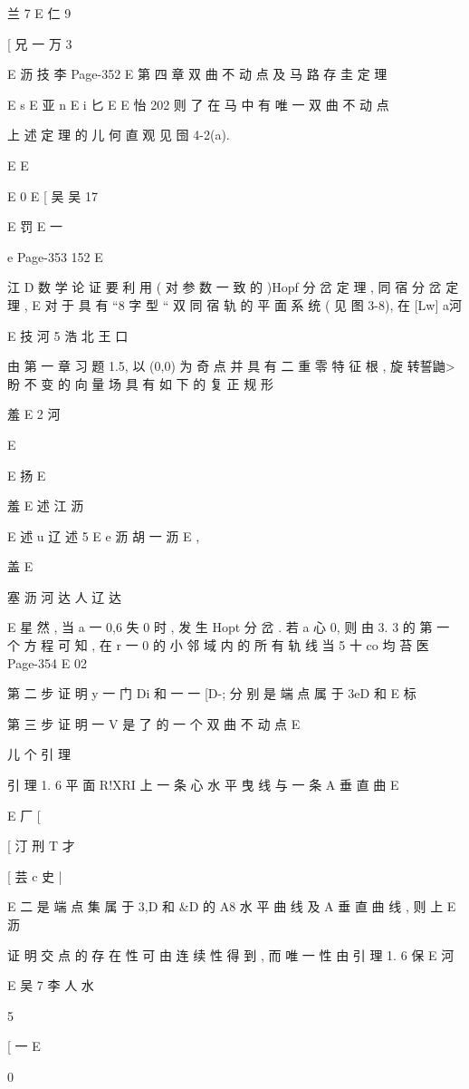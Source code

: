 {{{{{{{{{{{{{{{{{{{兰 7
E 仁 9

[ 兄 一 万 3

E 沥 技
李
Page-352
E 第 四 章 双 曲 不 动 点 及 马 路 存 圭 定 理

E s
E 亚 n
E i 匕
E
E 怡
202
则 了 在 马 中 有 唯 一 双 曲 不 动 点

上 述 定 理 的 儿 何 直 观 见 囹 4-2(a).

E
E

E 0
E [ 吴 吴 17

E 罚
E 一

e
Page-353
152 E

江
D
数 学 论 证 要 利 用 ( 对 参 数 一 致 的 )Hopf 分 岔 定 理 , 同 宿 分 岔 定 理 ,
E
对 于 具 有 “8 字 型 “ 双 同 宿 轨 的 平 面 系 统 ( 见 图 3-8), 在 [Lw]
a河

E 技 河 5 浩 北 王 口

由 第 一 章 习 题 1.5, 以 (0,0) 为 奇 点 并 具 有 二 重 零 特 征 根 , 旋
转誓鼬>盼 不 变 的 向 量 场 具 有 如 下 的 复 正 规 形

羞 E 2 河

E

E 扬
E

羞 E 述 江 沥

E 述 u 辽 述 5
E e 沥 胡 一 沥
E ,

盖 E

塞 沥 河 达 人 辽 达

E
星 然 , 当 a 一 0,6 失 0 时 , 发 生 Hopt 分 岔 . 若 a 心 0, 则 由 3. 3 的
第 一 个 方 程 可 知 , 在 r 一 0 的 小 邻 域 内 的 所 有 轨 线 当 5 十 co 均 苔
医
Page-354
E 02

第 二 步 证 明 y 一 门 Di 和 一 一 [D-; 分 别 是 端 点 属 于 3eD 和
E 标

第 三 步 证 明 一 V 是 了 的 一 个 双 曲 不 动 点
E

儿 个 引 理

引 理 1. 6 平 面 R!XRI 上 一 条 心 水 平 曳 线 与 一 条 A 垂 直 曲
E

E
厂
[

[ 汀 刑 T
才

[ 芸 c 史 |

E 二
是 端 点 集 属 于 3,D 和 &D 的 A8 水 平 曲 线 及 A 垂 直 曲 线 , 则 上
E 沥

证 明 交 点 的 存 在 性 可 由 连 续 性 得 到 , 而 唯 一 性 由 引 理 1. 6 保
E 河

E 吴 7 李 人
水

5

[ 一
E

0

}}}}}}}}}}}}}}}}}}}
